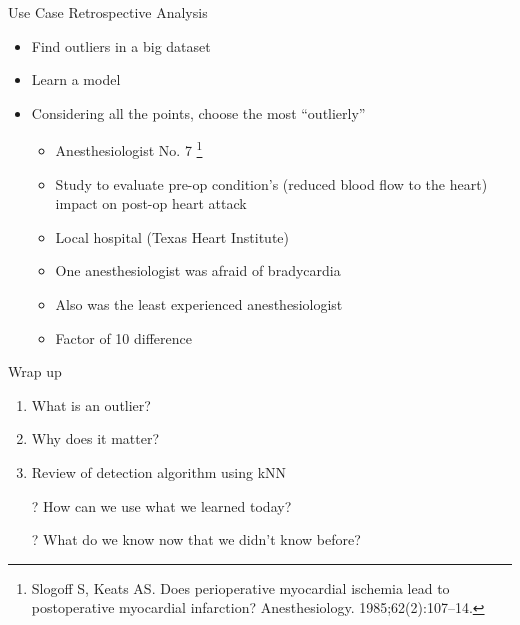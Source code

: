 \documentclass[aspectratio=169]{beamer}
\begin{document}
\begin{frame}{Use Case Retrospective Analysis}

\begin{itemize}
\item Find outliers in a big dataset
\item Learn a model 
\item Considering all the points, choose the most ``outlierly''
\begin{itemize}
	\item Anesthesiologist No. 7 \footnote{Slogoff S, Keats AS. Does perioperative myocardial ischemia lead to postoperative myocardial infarction? Anesthesiology. 1985;62(2):107--14.}
	\item Study to evaluate pre-op condition's (reduced blood flow to the heart) impact on post-op heart attack
	\item Local hospital (Texas Heart Institute)
	\item One anesthesiologist was afraid of bradycardia
	\item Also was the least experienced anesthesiologist
	\item Factor of 10 difference 
\end{itemize}
\end{itemize}

\end{frame}

\begin{frame}{Wrap up}
\begin{enumerate}
\item What is an outlier?
\item Why does it matter?
\item Review of detection algorithm using kNN
\end{enumerate}

\begin{itemize}
	\item[?] How can we use what we learned today?
	\vspace{2em}
	\item[?] What do we know now that we didn't know before?
\end{itemize}


\end{frame}
\end{document}
